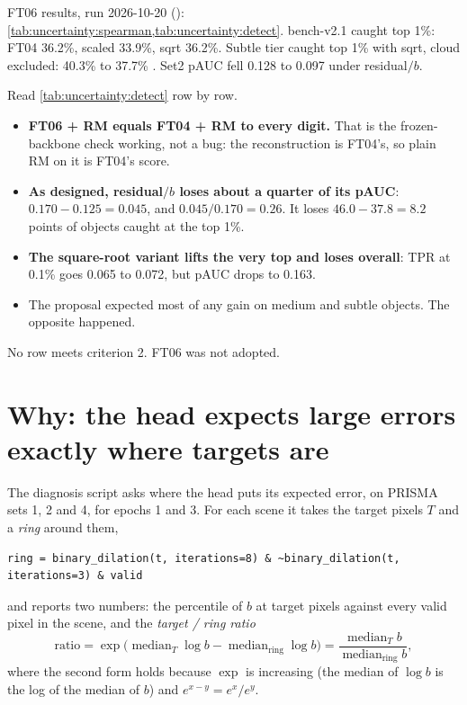 \begin{drift}
FT06 results, run 2026-10-20 ():
\cref{tab:uncertainty:spearman,tab:uncertainty:detect}. bench-v2.1 caught top 1\%: FT04 36.2\%, scaled
33.9\%, sqrt 36.2\%. Subtle tier caught top 1\% with sqrt, cloud excluded: 40.3\% to 37.7\%
. Set2 pAUC fell 0.128 to 0.097 under residual$/b$.
\end{drift}

Read \cref{tab:uncertainty:detect} row by row.
\begin{itemize}
\item \textbf{FT06 + RM equals FT04 + RM to every digit.} That is the frozen-backbone check working, not a bug:
  the reconstruction is FT04's, so plain RM on it is FT04's score.
\item \textbf{As designed, residual$/b$ loses about a quarter of its pAUC}: $0.170-0.125=0.045$, and
  $0.045/0.170=0.26$. It loses $46.0-37.8=8.2$ points of objects caught at the top 1\%.
\item \textbf{The square-root variant lifts the very top and loses overall}: TPR at 0.1\% goes 0.065 to 0.072,
  but pAUC drops to 0.163.
\item The proposal expected most of any gain on medium and subtle objects. The opposite happened.
\end{itemize}
No row meets criterion 2. FT06 was not adopted.

\section{Why: the head expects large errors exactly where targets are}\label{sec:uncertainty:why}

The diagnosis script  asks where the head puts its expected error, on PRISMA sets 1, 2
and 4, for epochs 1 and 3. For each scene it takes the target pixels $T$ and a \emph{ring} around them,
\begin{lstlisting}
ring = binary_dilation(t, iterations=8) & ~binary_dilation(t, iterations=3) & valid
\end{lstlisting}
and reports two numbers: the percentile of $b$ at target pixels against every valid pixel in the scene, and
the \emph{target / ring ratio}
\begin{equation}\label{eq:uncertainty:ratio}
\text{ratio} = \exp\!\big(\operatorname{median}_{T}\log b - \operatorname{median}_{\text{ring}}\log b\big)
 = \frac{\operatorname{median}_T b}{\operatorname{median}_\text{ring} b},
\end{equation}
where the second form holds because $\exp$ is increasing (the median of $\log b$ is the log of the median of
$b$) and $e^{x-y}=e^x/e^y$.

